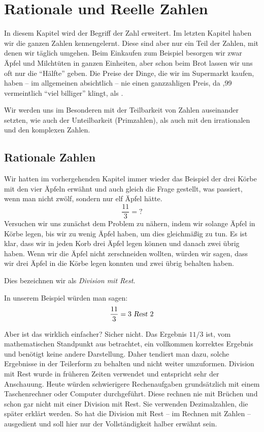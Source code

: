 

\chapter{Rationale und Reelle Zahlen}

In diesem Kapitel wird der Begriff der Zahl erweitert. Im letzten Kapitel haben wir die ganzen Zahlen kennengelernt. Diese sind aber nur ein Teil der Zahlen, mit denen wir täglich umgehen. Beim Einkaufen zum Beispiel besorgen wir zwar Äpfel und Milchtüten in ganzen Einheiten, aber schon beim Brot lassen wir uns oft nur die "`Hälfte"' geben. Die Preise der Dinge, die wir im Supermarkt kaufen, haben -- im allgemeinen absichtlich -- nie einen ganzzahligen Preis, da ,99 vermeintlich "`viel billiger"' klingt, als .

Wir werden uns im Besonderen mit der Teilbarkeit von Zahlen auseinander setzten, wie auch der Unteilbarkeit (Primzahlen), als auch mit den irrationalen und den komplexen Zahlen.

\section{Rationale Zahlen}

Wir hatten im vorhergehenden Kapitel immer wieder das Beispiel der drei Körbe mit den vier Äpfeln erwähnt und auch gleich die Frage gestellt, was passiert, wenn man nicht zwölf, sondern nur elf Äpfel hätte.
\[ \frac{11}{3} = ? \]
Versuchen wir uns zunächst dem Problem zu nähern, indem wir solange Äpfel in Körbe legen, bis wir zu wenig Äpfel haben, um dies gleichmäßig zu tun. Es ist klar, dass wir in jeden Korb drei Äpfel legen können und danach zwei übrig haben. Wenn wir die Äpfel nicht zerschneiden wollten, würden wir sagen, dass wir drei Äpfel in die Körbe legen konnten und zwei übrig behalten haben. 

\begin{definition}
Dies bezeichnen wir als \emph{Division mit Rest}. 
\end{definition}
In unserem Beispiel würden man sagen:
\[ \frac{11}{3} = 3 \textsl{ Rest } 2 \]

Aber ist das wirklich einfacher? Sicher nicht. Das Ergebnis $11/3$ ist, vom mathematischen Standpunkt aus betrachtet, ein vollkommen korrektes Ergebnis und benötigt keine andere Darstellung. Daher tendiert man dazu, solche Ergebnisse in der Teilerform zu behalten und nicht weiter umzuformen. Division mit Rest wurde in früheren Zeiten verwendet und entspricht sehr der Anschauung. Heute würden schwierigere Rechenaufgaben grundsätzlich mit einem Taschenrechner oder Computer durchgeführt. Diese rechnen nie mit Brüchen und schon gar nicht mit einer Division mit Rest. Sie verwenden Dezimalzahlen, die später erklärt werden. So hat die Division mit Rest -- im Rechnen mit Zahlen -- ausgedient und soll hier nur der Vollständigkeit halber erwähnt sein. 

